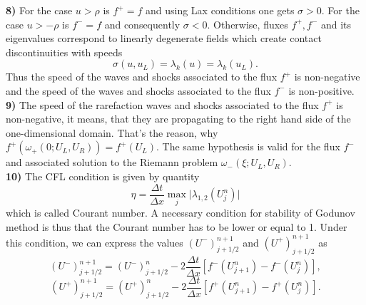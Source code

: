 \documentclass[a4paper, 10pt]{article}
\newcommand{\abs}[1]{\lvert#1\rvert}
\begin{document}
\textbf{8)} For the case $ u > \rho $ is $ f^{+} = f $ and using Lax conditions one gets $ \sigma > 0 $. For the case $ u > -\rho $ is $ f^{-} = f $ and consequently $ \sigma < 0 $. Otherwise, fluxes $ f^{+}, f^{-} $ and its eigenvalues correspond to linearly degenerate fields which create contact discontinuities with speeds
\begin{equation}
\sigma\left(u, u_L \right) = \lambda_k \left( u \right) = \lambda_k \left( u_L \right).
\end{equation}
Thus the speed of the waves and shocks associated to the flux $ f^+ $ is non-negative and the speed of the waves and shocks associated to the flux $ f^- $ is non-positive.\\  

\textbf{9)} The speed of the rarefaction waves and shocks associated to the flux $ f^+ $ is non-negative, it means, that they are propagating to the right hand side of the one-dimensional domain. That's the reason, why $ f^{+}(\omega_+(0; U_L, U_R)) = f^{+} (U_L) $. The same hypothesis is valid for the flux $ f^{-} $ and associated solution to the Riemann problem $ \omega_-(\xi; U_L, U_R) $.\\

\textbf{10)} The CFL condition is given by quantity \cite{leveque}
\begin{equation}
\eta = \frac{\Delta t}{\Delta x} \max_{j} \abs{\lambda_{1, 2}\left(U_{j}^{n} \right) }
\end{equation}
which is called Courant number. A necessary condition for stability of Godunov method is thus that the Courant number has to be lower or equal to 1. Under this condition, we can express the values $ (U^{-})^{n+1}_{j + 1/2} $ and $ (U^{+})^{n+1}_{j + 1/2} $ as
\begin{equation}
\left(U^{-} \right)^{n+1}_{j + 1/2} = \left(U^{-} \right)^{n}_{j + 1/2} - 2\frac{\Delta t}{\Delta x}\left[ f^{-} \left( U^{n}_{j+1} \right) - f^{-} \left( U^{n}_{j} \right) \right],
\end{equation}
\begin{equation}
\left(U^{+} \right)^{n+1}_{j + 1/2} = \left(U^{+} \right)^{n}_{j + 1/2} - 2\frac{\Delta t}{\Delta x}\left[ f^{+} \left( U^{n}_{j+1} \right) - f^{+} \left( U^{n}_{j} \right) \right].
\end{equation}\\
\end{document}
